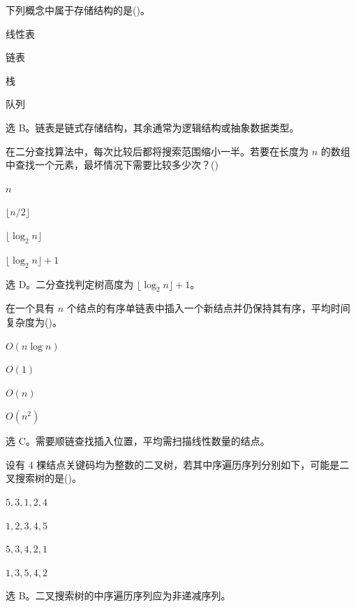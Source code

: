 \begin{question}
下列概念中属于存储结构的是(\quad)。
\begin{choiceoptions}[2]
  \item 线性表
  \item 链表
  \item 栈
  \item 队列
\end{choiceoptions}
\begin{solution}
选 B。链表是链式存储结构，其余通常为逻辑结构或抽象数据类型。
\end{solution}
\end{question}

\begin{question}
在二分查找算法中，每次比较后都将搜索范围缩小一半。若要在长度为 $n$ 的数组中查找一个元素，最坏情况下需要比较多少次？(\quad)
\begin{choiceoptions}[2]
  \item $n$
  \item $\lfloor n/2\rfloor$
  \item $\lfloor\log_2 n\rfloor$
  \item $\lfloor\log_2 n\rfloor+1$
\end{choiceoptions}
\begin{solution}
选 D。二分查找判定树高度为 $\lfloor\log_2 n\rfloor+1$。
\end{solution}
\end{question}

\begin{question}
在一个具有 $n$ 个结点的有序单链表中插入一个新结点并仍保持其有序，平均时间复杂度为(\quad)。
\begin{choiceoptions}[2]
  \item $O(n\log n)$
  \item $O(1)$
  \item $O(n)$
  \item $O(n^2)$
\end{choiceoptions}
\begin{solution}
选 C。需要顺链查找插入位置，平均需扫描线性数量的结点。
\end{solution}
\end{question}

\begin{question}
设有 $4$ 棵结点关键码均为整数的二叉树，若其中序遍历序列分别如下，可能是二叉搜索树的是(\quad)。
\begin{choiceoptions}[2]
  \item $5,3,1,2,4$
  \item $1,2,3,4,5$
  \item $5,3,4,2,1$
  \item $1,3,5,4,2$
\end{choiceoptions}
\begin{solution}
选 B。二叉搜索树的中序遍历序列应为非递减序列。
\end{solution}
\end{question}

